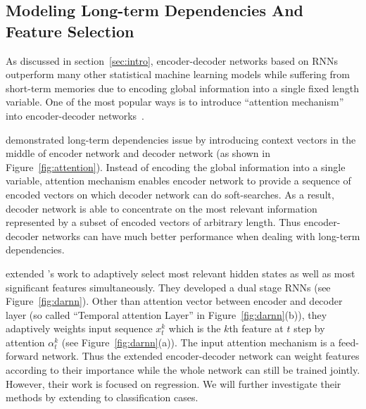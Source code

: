 \message{ !name(usyd_phd_proposal.tex)}\documentclass{article} \usepackage{tabularx}
\renewcommand{\citename}{\citet} \renewcommand{\cite}{\citep}
\begin{document}
\subsection{Modeling Long-term Dependencies And Feature
  Selection}
\label{sec:ltfs}

As discussed in section~\ref{sec:intro}, encoder-decoder networks
based on RNNs outperform many other statistical machine learning
models while suffering from short-term memories due to encoding
global information into a single fixed length variable. One of
the most popular ways is to introduce ``attention mechanism''
into encoder-decoder networks~\cite{attention}.

\citename{attention} demonstrated long-term dependencies issue by
introducing context vectors in the middle of encoder network and
decoder network (as shown in Figure~\ref{fig:attention}). Instead
of encoding the global information into a single variable,
attention mechanism enables encoder network to provide a sequence
of encoded vectors on which decoder network can do soft-searches.
As a result, decoder network is able to concentrate on the most
relevant information represented by a subset of encoded vectors
of arbitrary length. Thus encoder-decoder networks can have much
better performance when dealing with long-term dependencies.

\citename{qin2017dual} extended \citename{attention}'s work to
adaptively select most relevant hidden states as well as most
significant features simultaneously. They developed a dual stage
RNNs (see Figure~\ref{fig:darnn}). Other than attention vector
between encoder and decoder layer (so called ``Temporal attention
Layer'' in Figure~\ref{fig:darnn}(b)), they adaptively weights
input sequence $x_t^k$ which is the $k$th feature at $t$ step by
attention $\alpha_t^k$ (see Figure~\ref{fig:darnn}(a)). The input
attention mechanism is a feed-forward network. Thus the extended
encoder-decoder network can weight features according to their
importance while the whole network can still be trained jointly.
However, their work is focused on regression. We will further
investigate their methods by extending to classification cases.
\end{document}
